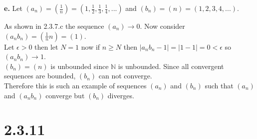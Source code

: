 \documentclass{article}
\begin{document}
{\Large \textbf{e.}} Let $(a_n) = (\frac{1}{n}) = (1,\frac{1}{2},\frac{1}{3},\frac{1}{4}, ...)$ and $(b_n) = (n) = (1, 2, 3, 4, ...)$.
\begin{center}
    \doublespacing
    As shown in 2.3.7.c the sequence $(a_n)\rightarrow 0$. Now consider $(a_n b_n) = (\frac{1}{n} n) = (1)$.
    \\Let $\epsilon > 0$ then let $N = 1$ now if $n\geq N$ then $|a_n b_n - 1| = |1 - 1| = 0 <\epsilon$ so $(a_n b_n)\rightarrow 1$.
    \\$(b_n) = (n)$ is unbounded since $\mathbb{N}$ is unbounded. Since all convergent sequences are bounded, $(b_n)$ can not converge.
    \\Therefore this is such an example of sequences $(a_n)$ and $(b_n)$ such that $(a_n)$ and $(a_n b_n)$ converge but $(b_n)$ diverges.
\end{center}


\newpage
\section*{2.3.11}
\end{document}
